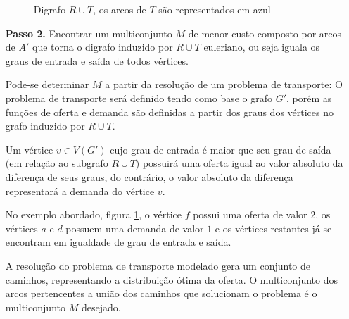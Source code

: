 \begin{enumerate}
\begin{figure}[H]
            \caption{Digrafo $R\cup T$, os arcos de $T$ são representados em azul}
            \label{graphRUT}
        \end{figure}


        \item[\textbf{Passo 2.}]
            Encontrar um multiconjunto $M$ de menor custo composto por arcos de $A'$ que torna o digrafo induzido por $R \cup T$ euleriano, ou seja iguala os graus de entrada e saída de todos vértices.

			Pode-se determinar $M$ a partir da resolução de um problema de transporte: 
            O problema de transporte será definido tendo como base o grafo $G'$, porém as funções de oferta e demanda são definidas a partir dos graus dos vértices no grafo induzido por $R \cup T$.

            Um vértice $v \in V(G')$ cujo grau de entrada é maior que seu grau de saída (em relação ao subgrafo $R \cup T$) possuirá uma oferta igual ao valor absoluto da diferença de seus graus, do contrário, o valor absoluto da diferença representará a demanda do vértice $v$.

            No exemplo abordado, figura \ref{graphRUT}, o vértice $f$ possui uma oferta de valor $2$, os vértices $a$ e $d$ possuem uma demanda de valor $1$ e os vértices restantes já se encontram em igualdade de grau de entrada e saída.

			A resolução do problema de transporte modelado gera um conjunto de caminhos, representando a distribuição ótima da oferta. 
            O multiconjunto dos arcos pertencentes a união dos caminhos que solucionam o problema é o multiconjunto $M$ desejado.


\end{enumerate}
